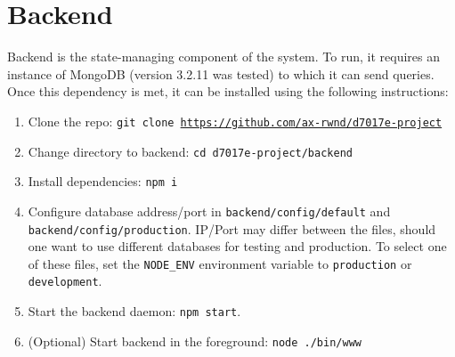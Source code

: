\section{Backend}
Backend is the state-managing component of the system. To run, it requires an instance of MongoDB (version 3.2.11 was tested) to which it can send queries. Once this dependency is met, it can be installed using the following instructions:
\begin{enumerate}
\item Clone the repo: \texttt{git clone \url{https://github.com/ax-rwnd/d7017e-project}}
\item Change directory to backend: \texttt{cd d7017e-project/backend}
\item Install dependencies: \texttt{npm i}
\item Configure database address/port in \texttt{backend/config/default} and \\
\texttt{backend/config/production}. IP/Port may differ between the files, should one want to use different databases for testing and production. To select one of these files, set the \texttt{NODE\_ENV} environment variable to \texttt{production} or \texttt{development}.
\item Start the backend daemon: \texttt{npm start}.
\item (Optional) Start backend in the foreground: \texttt{node ./bin/www}
\end{enumerate}

